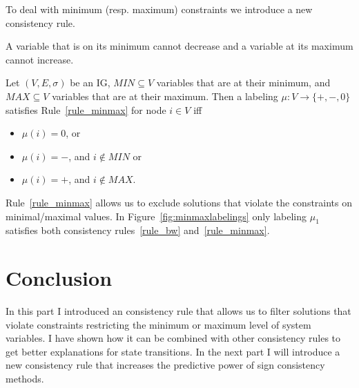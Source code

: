 To deal with minimum (resp. maximum) constraints we introduce a new consistency rule.

\begin{srule}
\label{rule_minmax}
{\upshape A variable that is on its minimum cannot decrease and a variable at its maximum cannot increase.}

Let $(V, E, \sigma)$ be an IG, 
$MIN \subseteq V$ variables that are at their minimum, and  
$MAX \subseteq V$ variables that are at their maximum.
Then a labeling $\mu : V \rightarrow \{\plus, \minus, 0\}$ satisfies Rule~\ref{rule_minmax} for node $i \in V$ iff
\begin{itemize}
 \item $\mu(i) = 0$, or
 \item $\mu(i) = \minus$, and $i \notin MIN$ or 
 \item $\mu(i) = \plus$, and $i \notin MAX$.
\end{itemize}
\end{srule}

Rule~\ref{rule_minmax} allows us to exclude solutions that violate the constraints on minimal/maximal values.
In Figure~\ref{fig:minmaxlabelings} only labeling $\mu_1$ satisfies both consistency rules~\ref{rule_bw} and~\ref{rule_minmax}.

\section*{Conclusion}
In this part I introduced an consistency rule that allows us to filter solutions that violate constraints 
 restricting the minimum or maximum level of system variables.
I have shown how it can be combined with other consistency rules to get better explanations for state transitions.
In the next part I will introduce a new consistency rule that increases the predictive power of sign consistency methods.